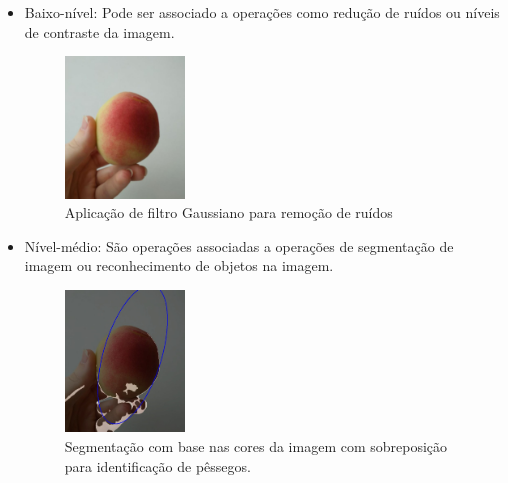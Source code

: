 

\begin{itemize}
\item Baixo-nível: 
	Pode ser associado a operações como redução de ruídos ou níveis de contraste da imagem. 
   \begin{figure}[h]
	\caption{\label{fig:blur}Aplicação de filtro Gaussiano para remoção de ruídos}
	\begin{center}
	    \includegraphics[width=0.3\textwidth]{peachs/blur}
	\end{center}
\end{figure} 
\item Nível-médio:
	São operações associadas a operações de segmentação de imagem ou reconhecimento de objetos na imagem.   
       \begin{figure}[H]
	\caption{\label{fig:segment}Segmentação com base nas cores da imagem com sobreposição para identificação de pêssegos.}
	\begin{center}
	    \includegraphics[width=0.3\textwidth]{peachs/identified}
	\end{center}
\end{figure}


\end{itemize}
